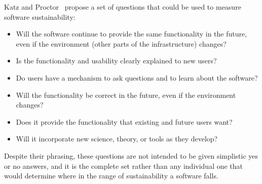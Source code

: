 \documentclass[11pt, oneside]{amsart}
\begin{document}
Katz and Proctor~\cite{Katz_WSSSPE} propose a set of questions that
could be used to measure software sustainability:
\begin{itemize}
\item Will the software continue to provide the same functionality in
  the future, even if the environment (other parts of the
  infrastructure) changes?
\item Is the functionality and usability clearly explained to new
  users?
\item Do users have a mechanism to ask questions and to learn about
  the software?
\item Will the functionality be correct in the future, even if the
  environment changes?
\item Does it provide the functionality that existing and future users
  want?
\item Will it incorporate new science, theory, or tools as they
  develop?
\end{itemize}
Despite their phrasing, these questions are not intended to be given
simplistic yes or no answers, and it is the complete set rather than
any individual one that would determine where in the range of
sustainability a software falls.
\end{document}
